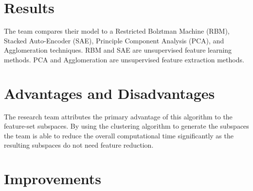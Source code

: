\documentclass[]{article}
\begin{document}
\section{Results}

The team compares their model to a Restricted Bolztman Machine (RBM), Stacked Auto-Encoder (SAE), Principle Component Analysis (PCA), and Agglomeration techniques.
RBM and SAE are unsupervised feature learning methods. 
PCA and Agglomeration are unsupervised feature extraction methods.

\section{Advantages and Disadvantages}

The research team attributes the primary advantage of this algorithm to the feature-set subspaces.
By using the clustering algorithm to generate the subspaces the team is able to reduce the overall computational time significantly as the resulting subspaces do not need feature reduction.


\section{Improvements}


\clearpage


\end{document}
